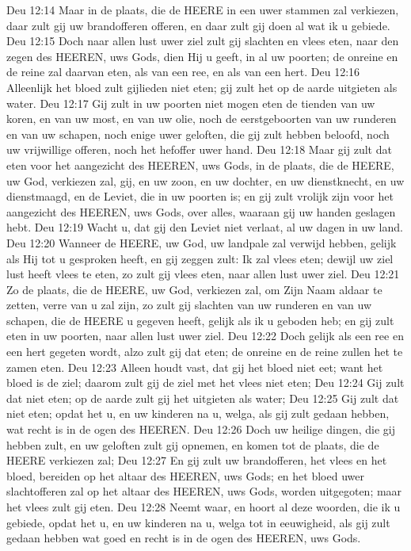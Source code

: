 Deu 12:14  Maar in de plaats, die de HEERE in een uwer stammen zal verkiezen, daar zult gij uw brandofferen offeren, en daar zult gij doen al wat ik u gebiede.
Deu 12:15  Doch naar allen lust uwer ziel zult gij slachten en vlees eten, naar den zegen des HEEREN, uws Gods, dien Hij u geeft, in al uw poorten; de onreine en de reine zal daarvan eten, als van een ree, en als van een hert.
Deu 12:16  Alleenlijk het bloed zult gijlieden niet eten; gij zult het op de aarde uitgieten als water.
Deu 12:17  Gij zult in uw poorten niet mogen eten de tienden van uw koren, en van uw most, en van uw olie, noch de eerstgeboorten van uw runderen en van uw schapen, noch enige uwer geloften, die gij zult hebben beloofd, noch uw vrijwillige offeren, noch het hefoffer uwer hand.
Deu 12:18  Maar gij zult dat eten voor het aangezicht des HEEREN, uws Gods, in de plaats, die de HEERE, uw God, verkiezen zal, gij, en uw zoon, en uw dochter, en uw dienstknecht, en uw dienstmaagd, en de Leviet, die in uw poorten is; en gij zult vrolijk zijn voor het aangezicht des HEEREN, uws Gods, over alles, waaraan gij uw handen geslagen hebt.
Deu 12:19  Wacht u, dat gij den Leviet niet verlaat, al uw dagen in uw land.
Deu 12:20  Wanneer de HEERE, uw God, uw landpale zal verwijd hebben, gelijk als Hij tot u gesproken heeft, en gij zeggen zult: Ik zal vlees eten; dewijl uw ziel lust heeft vlees te eten, zo zult gij vlees eten, naar allen lust uwer ziel.
Deu 12:21  Zo de plaats, die de HEERE, uw God, verkiezen zal, om Zijn Naam aldaar te zetten, verre van u zal zijn, zo zult gij slachten van uw runderen en van uw schapen, die de HEERE u gegeven heeft, gelijk als ik u geboden heb; en gij zult eten in uw poorten, naar allen lust uwer ziel.
Deu 12:22  Doch gelijk als een ree en een hert gegeten wordt, alzo zult gij dat eten; de onreine en de reine zullen het te zamen eten.
Deu 12:23  Alleen houdt vast, dat gij het bloed niet eet; want het bloed is de ziel; daarom zult gij de ziel met het vlees niet eten;
Deu 12:24  Gij zult dat niet eten; op de aarde zult gij het uitgieten als water;
Deu 12:25  Gij zult dat niet eten; opdat het u, en uw kinderen na u, welga, als gij zult gedaan hebben, wat recht is in de ogen des HEEREN.
Deu 12:26  Doch uw heilige dingen, die gij hebben zult, en uw geloften zult gij opnemen, en komen tot de plaats, die de HEERE verkiezen zal;
Deu 12:27  En gij zult uw brandofferen, het vlees en het bloed, bereiden op het altaar des HEEREN, uws Gods; en het bloed uwer slachtofferen zal op het altaar des HEEREN, uws Gods, worden uitgegoten; maar het vlees zult gij eten.
Deu 12:28  Neemt waar, en hoort al deze woorden, die ik u gebiede, opdat het u, en uw kinderen na u, welga tot in eeuwigheid, als gij zult gedaan hebben wat goed en recht is in de ogen des HEEREN, uws Gods.
